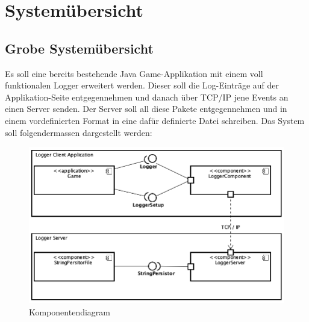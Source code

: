 \section{Systemübersicht}
\subsection{Grobe Systemübersicht}
Es soll eine bereits bestehende Java Game-Applikation mit einem voll funktionalen Logger erweitert werden. Dieser soll die Log-Einträge auf der Applikation-Seite entgegennehmen und danach über TCP/IP jene Events an einen Server senden. Der Server soll all diese Pakete entgegennehmen und in einem vordefinierten Format in eine dafür definierte Datei schreiben. 
Das System soll folgendermassen dargestellt werden:
\begin{figure}[H]
	\centering
	\includegraphics[width=\textwidth]{1_Systemuebersicht/Bilder/componentDiagram.png}
	\caption{Komponentendiagram}
	\label{fig:Komponentendiagramm}
\end{figure}